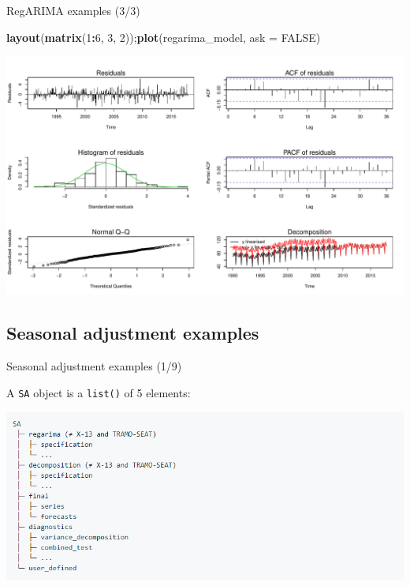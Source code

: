 \documentclass[10pt,xcolor=table,color={dvipsnames,usenames},ignorenonframetext,usepdftitle=false,french]{beamer}
\newenvironment{Shaded}{\begin{snugshade}}{\end{snugshade}}
\newcommand{\DataTypeTok}[1]{\textcolor[rgb]{0.13,0.29,0.53}{#1}}
\newcommand{\DecValTok}[1]{\textcolor[rgb]{0.00,0.00,0.81}{#1}}
\newcommand{\KeywordTok}[1]{\textcolor[rgb]{0.13,0.29,0.53}{\textbf{#1}}}
\newcommand{\NormalTok}[1]{#1}
\newcommand{\OperatorTok}[1]{\textcolor[rgb]{0.81,0.36,0.00}{\textbf{#1}}}
\newcommand{\OtherTok}[1]{\textcolor[rgb]{0.56,0.35,0.01}{#1}}
\begin{document}
\begin{frame}[fragile]{RegARIMA examples (3/3)}
\protect\hypertarget{regarima-examples-33}{}

\begin{Shaded}
\begin{Highlighting}[]
\KeywordTok{layout}\NormalTok{(}\KeywordTok{matrix}\NormalTok{(}\DecValTok{1}\OperatorTok{:}\DecValTok{6}\NormalTok{, }\DecValTok{3}\NormalTok{, }\DecValTok{2}\NormalTok{));}\KeywordTok{plot}\NormalTok{(regarima_model, }\DataTypeTok{ask =} \OtherTok{FALSE}\NormalTok{)}
\end{Highlighting}
\end{Shaded}

\includegraphics{img/markdown-unnamed-chunk-4-1.pdf}

\end{frame}

\hypertarget{seasonal-adjustment-examples}{%
\subsection{Seasonal adjustment
examples}\label{seasonal-adjustment-examples}}

\begin{frame}[fragile]{Seasonal adjustment examples (1/9)}
\protect\hypertarget{seasonal-adjustment-examples-19}{}

A \texttt{SA} object is a \texttt{list()} of 5 elements:

\includegraphics{img/sa_obj_struct.png}

\end{frame}
\end{document}

